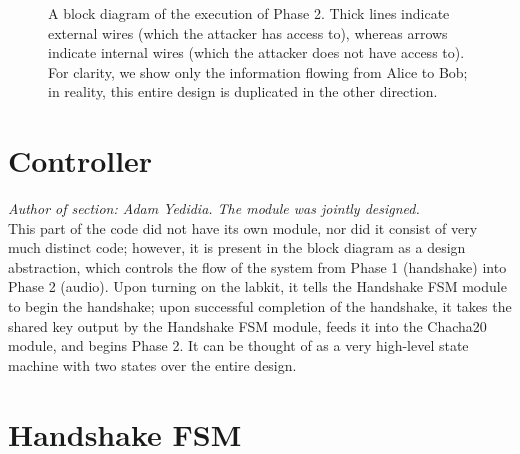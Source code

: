 \documentclass[a4paper]{report}
\begin{document}
\begin{figure}
\label{fig3b}
%
\centering \caption{A block diagram of the execution of Phase 2. Thick lines indicate external wires (which the attacker has access to), whereas arrows indicate internal wires (which the attacker does not have access to). For clarity, we show only the information flowing from Alice to Bob; in reality, this entire design is duplicated in the other direction.}
\end{figure}

\section{Controller}

\emph{Author of section: Adam Yedidia. The module was jointly designed.} \\

This part of the code did not have its own module, nor did it consist of very much distinct code; however, it is present in the block diagram as a design abstraction, which controls the flow of the system from Phase 1 (handshake) into Phase 2 (audio). Upon turning on the labkit, it tells the Handshake FSM module to begin the handshake; upon successful completion of the handshake, it takes the shared key output by the Handshake FSM module, feeds it into the Chacha20 module, and begins Phase 2. It can be thought of as a very high-level state machine with two states over the entire design.

\section{Handshake FSM}
\end{document}
